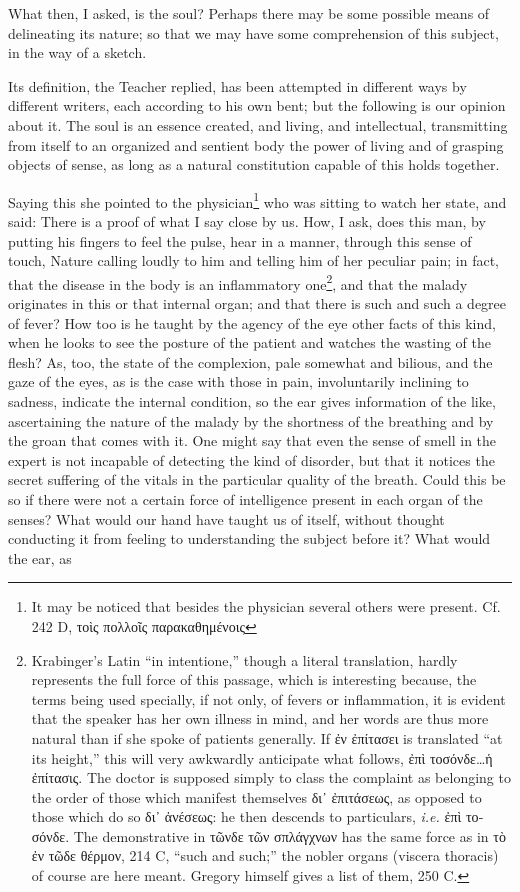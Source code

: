 What then, I asked, is the soul? Perhaps there may be some possible means of delineating its nature; so that we may have some comprehension of this subject, in the way of a sketch.

Its definition, the Teacher replied, has been attempted in different ways by different writers, each according to his own bent; but the following is our opinion about it. The soul is an essence created, and living, and intellectual, transmitting from itself to an organized and sentient body the power of living and of grasping objects of sense, as long as a natural constitution capable of this holds together.

Saying this she pointed to the physician\footnote{It may be noticed that besides the physician several others were present. Cf. 242 D, \textgreek{τοὶς πολλοῖς παρακαθημένοις}} who was sitting to watch her state, and said: There is a proof of what I say close by us. How, I ask, does this man, by putting his fingers to feel the pulse, hear in a manner, through this sense of touch, Nature calling loudly to him and telling him of her peculiar pain; in fact, that the disease in the body is an inflammatory one\footnote{Krabinger’s Latin “in intentione,” though a literal translation, hardly represents the full force of this passage, which is interesting because, the terms being used specially, if not only, of fevers or inflammation, it is evident that the speaker has her own illness in mind, and her words are thus more natural than if she spoke of patients generally. If \textgreek{ἐν ἐπίτασει} is translated “at its height,” this will very awkwardly anticipate what follows, \textgreek{ἐπὶ τοσόνδε…ἡ ἐπίτασις}. The doctor is supposed simply to class the complaint as belonging to the order of those which manifest themselves \textgreek{δι᾽ ἐπιτάσεως}, as opposed to those which do so \textgreek{δι᾽ ἀνέσεως}: he then descends to particulars, \emph{i.e.} \textgreek{ἐπὶ τοσόνδε}. The demonstrative in \textgreek{τῶνδε τῶν σπλάγχνων} has the same force as in \textgreek{τὸ ἐν τῶδε θέρμον}, 214 C, “such and such;” the nobler organs (viscera thoracis) of course are here meant. Gregory himself gives a list of them, 250 C.}, and that the malady originates in this or that internal organ; and that there is such and such a degree of fever? How too is he taught by the agency of the eye other facts of this kind, when he looks to see the posture of the patient and watches the wasting of the flesh? As, too, the state of the complexion, pale somewhat and bilious, and the gaze of the eyes, as is the case with those in pain, involuntarily inclining to sadness, indicate the internal condition, so the ear gives information of the like, ascertaining the nature of the malady by the shortness of the breathing and by the groan that comes with it. One might say that even the sense of smell in the expert is not incapable of detecting the kind of disorder, but that it notices the secret suffering of the vitals in the particular quality of the breath. Could this be so if there were not a certain force of intelligence present in each organ of the senses? What would our hand have taught us of itself, without thought conducting it from feeling to understanding the subject before it? What would the ear, as 